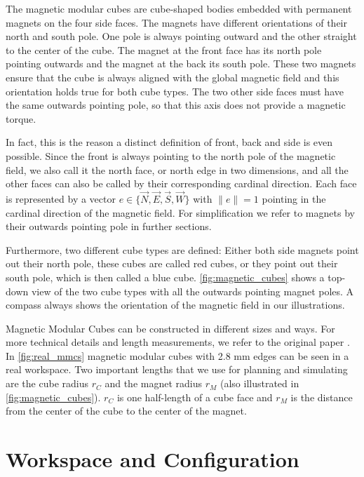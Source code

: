 The magnetic modular cubes are cube-shaped bodies embedded with permanent magnets on the four side faces.
The magnets have different orientations of their north and south pole. 
One pole is always pointing outward and the other straight to the center of the cube.
The magnet at the front face has its north pole pointing outwards and the magnet at the back its south pole.
These two magnets ensure that the cube is always aligned with the global magnetic field and this orientation holds true for both cube types.
The two other side faces must have the same outwards pointing pole, so that this axis does not provide a magnetic torque.

In fact, this is the reason a distinct definition of front, back and side is even possible.
Since the front is always pointing to the north pole of the magnetic field, we also call it the north face, or north edge in two dimensions, and all the other faces can also be called by their corresponding cardinal direction.
Each face is represented by a vector $e \in \{ \vec{N},\vec{E},\vec{S},\vec{W}\}$ with $\lVert e \rVert = 1$ pointing in the cardinal direction of the magnetic field.
For simplification we refer to magnets by their outwards pointing pole in further sections.

Furthermore, two different cube types are defined:
Either both side magnets point out their north pole, these cubes are called red cubes, or they point out their south pole, which is then called a blue cube.
\autoref{fig:magnetic_cubes} shows a top-down view of the two cube types with all the outwards pointing magnet poles.
A compass always shows the orientation of the magnetic field in our illustrations.

Magnetic Modular Cubes can be constructed in different sizes and ways. For more technical details and length measurements, we refer to the original paper \cite{Bhattacharjee2022}.
In \autoref{fig:real_mmcs} magnetic modular cubes with 2.8 mm edges can be seen in a real workspace.
Two important lengths that we use for planning and simulating are the cube radius $r_C$ and the magnet radius $r_M$ (also illustrated in \autoref{fig:magnetic_cubes}).
$r_C$ is one half-length of a cube face and $r_M$ is the distance from the center of the cube to the center of the magnet.



\section{Workspace and Configuration}
\label{sec:workspace}

